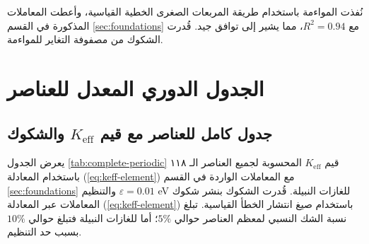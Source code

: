 \documentclass[12pt,a4paper]{article}
\theoremstyle{remark}
\newcommand{\Keff}{K_{\mathrm{eff}}}
\begin{document}
	نُفذت المواءمة باستخدام طريقة المربعات الصغرى الخطية القياسية، وأعطت المعاملات المذكورة في القسم \ref{sec:foundations} مع $R^2 = 0.94$، مما يشير إلى توافق جيد. قُدرت الشكوك من مصفوفة التغاير للمواءمة.
	
	\section{الجدول الدوري المعدل للعناصر}
	\label{sec:periodic-table}
	
	\subsection{جدول كامل للعناصر مع قيم $\Keff$ والشكوك}
	
	يعرض الجدول \ref{tab:complete-periodic} قيم $\Keff$ المحسوبة لجميع العناصر الـ ١١٨ باستخدام المعادلة (\ref{eq:keff-element}) مع المعاملات الواردة في القسم \ref{sec:foundations} والتنظيم $\varepsilon = 0.01$ eV للغازات النبيلة. قُدرت الشكوك بنشر شكوك المعاملات عبر المعادلة (\ref{eq:keff-element}) باستخدام صيغ انتشار الخطأ القياسية. تبلغ نسبة الشك النسبي لمعظم العناصر حوالي $5\%$؛ أما للغازات النبيلة فتبلغ حوالي $10\%$ بسبب حد التنظيم.
	
\end{document}
